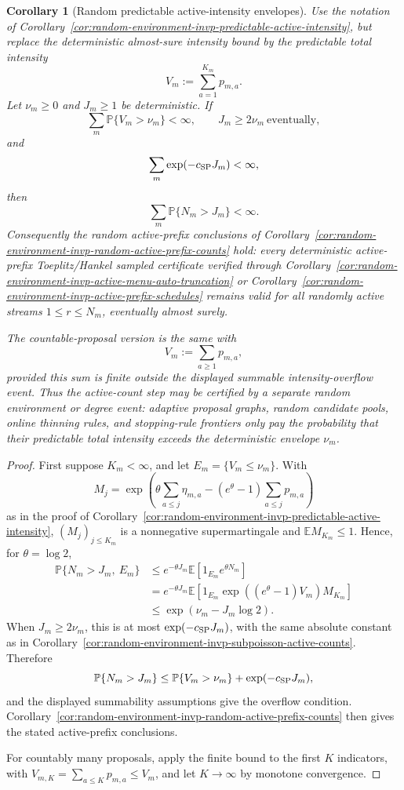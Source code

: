 \documentclass[11pt]{amsart}
\numberwithin{equation}{section}
\newtheorem{corollary}[theorem]{Corollary}
\theoremstyle{definition}
\theoremstyle{remark}
\newcommand{\Prob}{\mathbb P}
\newcommand{\Exp}{\mathbb E}
\begin{document}
\begin{corollary}[Random predictable active-intensity envelopes]
\label{cor:random-environment-invp-random-predictable-active-intensity}
Use the notation of
Corollary~\ref{cor:random-environment-invp-predictable-active-intensity}, but
replace the deterministic almost-sure intensity bound by the predictable total
intensity
\[
  V_m:=\sum_{a=1}^{K_m}p_{m,a}.
\]
Let \(\nu_m\ge0\) and \(J_m\ge1\) be deterministic.  If
\[
  \sum_m\Prob\{V_m>\nu_m\}<\infty,
  \qquad
  J_m\ge2\nu_m\ \text{eventually},
\]
and
\[
  \sum_m\exp(-c_{\rm SP}J_m)<\infty,
\]
then
\[
  \sum_m\Prob\{N_m>J_m\}<\infty .
\]
Consequently the random active-prefix conclusions of
Corollary~\ref{cor:random-environment-invp-random-active-prefix-counts} hold:
every deterministic active-prefix Toeplitz/Hankel sampled certificate verified
through Corollary~\ref{cor:random-environment-invp-active-menu-auto-truncation}
or Corollary~\ref{cor:random-environment-invp-active-prefix-schedules} remains
valid for all randomly active streams \(1\le r\le N_m\), eventually almost
surely.

The countable-proposal version is the same with
\[
  V_m:=\sum_{a\ge1}p_{m,a},
\]
provided this sum is finite outside the displayed summable intensity-overflow
event.  Thus the active-count step may be certified by a separate random
environment or degree event: adaptive proposal graphs, random candidate pools,
online thinning rules, and stopping-rule frontiers only pay the probability
that their predictable total intensity exceeds the deterministic envelope
\(\nu_m\).
\end{corollary}

\begin{proof}
First suppose \(K_m<\infty\), and let \(E_m=\{V_m\le\nu_m\}\).  With
\[
  M_j=
  \exp\!\left(
    \theta\sum_{a\le j}\eta_{m,a}
    -(e^\theta-1)\sum_{a\le j}p_{m,a}
  \right)
\]
as in the proof of
Corollary~\ref{cor:random-environment-invp-predictable-active-intensity},
\((M_j)_{j\le K_m}\) is a nonnegative supermartingale and
\(\Exp M_{K_m}\le1\).  Hence, for \(\theta=\log2\),
\[
\begin{aligned}
  \Prob\{N_m>J_m,\ E_m\}
  &\le
  e^{-\theta J_m}
  \Exp\!\left[1_{E_m}e^{\theta N_m}\right]  \\
  &=
  e^{-\theta J_m}
  \Exp\!\left[
    1_{E_m}\exp\!\left((e^\theta-1)V_m\right)M_{K_m}
  \right]  \\
  &\le
  \exp(\nu_m-J_m\log2).
\end{aligned}
\]
When \(J_m\ge2\nu_m\), this is at most
\(\exp(-c_{\rm SP}J_m)\), with the same absolute constant as in
Corollary~\ref{cor:random-environment-invp-subpoisson-active-counts}.  Therefore
\[
  \Prob\{N_m>J_m\}
  \le
  \Prob\{V_m>\nu_m\}+\exp(-c_{\rm SP}J_m),
\]
and the displayed summability assumptions give the overflow condition.
Corollary~\ref{cor:random-environment-invp-random-active-prefix-counts} then
gives the stated active-prefix conclusions.

For countably many proposals, apply the finite bound to the first \(K\)
indicators, with \(V_{m,K}=\sum_{a\le K}p_{m,a}\le V_m\), and let
\(K\to\infty\) by monotone convergence.
\end{proof}
\end{document}
